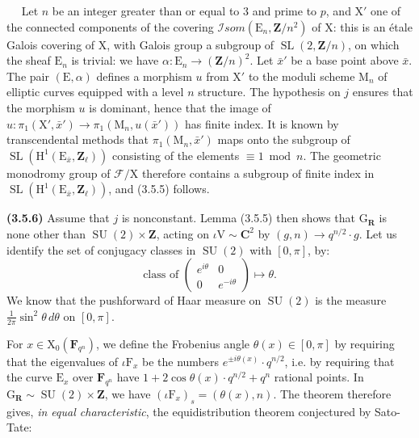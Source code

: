 \documentclass[11pt,leqno]{article}
\newcommand{\Page}[1]{\ifvmode\noindent\else\unskip\ \fi{\footnotesize\textcolor{gray}{[p.\,#1]}}\ \ignorespaces}
\begin{document}
\Page{212}
Let \(n\) be an integer greater than or equal to \(3\) and prime to \(p\), and \(\mathrm X'\) one of the connected components of the covering \(\mathscr I\mathit{som}(\mathrm E_n,\mathbf Z/n^2)\) of \(\mathrm X\): this is an étale Galois covering of \(\mathrm X\), with Galois group a subgroup of \(\operatorname{SL}(2,\mathbf Z/n)\), on which the sheaf \(\mathrm E_n\) is trivial: we have \(\alpha:\mathrm E_n\to(\mathbf Z/n)^2\). Let \(\bar x'\) be a base point above \(\bar x\). The pair \((\mathrm E,\alpha)\) defines a morphism \(u\) from \(\mathrm X'\) to the moduli scheme \(\mathrm M_n\) of elliptic curves equipped with a level \(n\) structure. The hypothesis on \(j\) ensures that the morphism \(u\) is dominant, hence that the image of \(u:\pi_1(\mathrm X',\bar x')\to\pi_1(\mathrm M_n,u(\bar x'))\) has finite index. It is known by transcendental methods that \(\pi_1(\mathrm M_n,\bar x')\) maps onto the subgroup of \(\operatorname{SL}(\mathrm H^1(\mathrm E_{\bar x},\mathbf Z_\ell))\) consisting of the elements \(\equiv1\bmod n\). The geometric monodromy group of \(\mathscr F/\mathrm X\) therefore contains a subgroup of finite index in \(\operatorname{SL}(\mathrm H^1(\mathrm E_{\bar x},\mathbf Z_\ell))\), and (3.5.5) follows.

\textbf{(3.5.6)} Assume that \(j\) is nonconstant. Lemma (3.5.5) then shows that \(\mathrm G_{\mathbf R}\) is none other than \(\operatorname{SU}(2)\times\mathbf Z\), acting on \(\iota\mathrm V\sim\mathbf C^2\) by \((g,n)\to q^{n/2}\cdot g\). Let us identify the set of conjugacy classes in \(\operatorname{SU}(2)\) with \([0,\pi]\), by:
\[
\text{class of }
\begin{pmatrix}
e^{i\theta}&0\\
0&e^{-i\theta}
\end{pmatrix}
\longmapsto\theta.
\]
We know that the pushforward of Haar measure on \(\operatorname{SU}(2)\) is the measure \(\displaystyle\frac{1}{2\pi}\sin^2\theta\,d\theta\) on \([0,\pi]\).

For \(x\in\mathrm X_0(\mathbf F_{q^n})\), we define the Frobenius angle \(\theta(x)\in[0,\pi]\) by requiring that the eigenvalues of \(\iota\mathrm F_x\) be the numbers \(e^{\pm i\theta(x)}\cdot q^{n/2}\), i.e. by requiring that the curve \(\mathrm E_x\) over \(\mathbf F_{q^n}\) have \(1+2\cos\theta(x)\cdot q^{n/2}+q^n\) rational points. In \(\mathrm G_{\mathbf R}\sim\operatorname{SU}(2)\times\mathbf Z\), we have \((\iota\mathrm F_x)_s=(\theta(x),n)\). The theorem therefore gives, \textit{in equal characteristic}, the equidistribution theorem conjectured by Sato-Tate:
\end{document}
